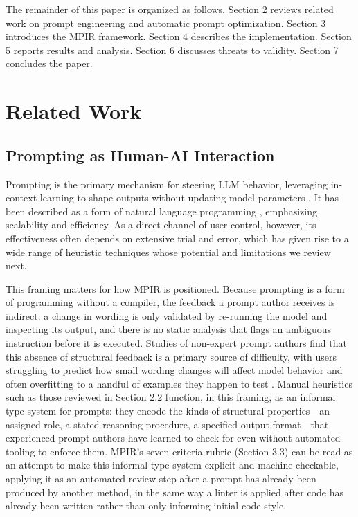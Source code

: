 \documentclass[a4paper,fleqn]{cas-sc}
\begin{document}
The remainder of this paper is organized as follows. Section 2 reviews related work on prompt engineering and automatic prompt optimization. Section 3 introduces the MPIR framework. Section 4 describes the implementation. Section 5 reports results and analysis. Section 6 discusses threats to validity. Section 7 concludes the paper.

\section{Related Work}

\subsection{Prompting as Human-AI Interaction}

Prompting is the primary mechanism for steering LLM behavior, leveraging in-context learning to shape outputs without updating model parameters \citep{liu2023}. It has been described as a form of natural language programming \citep{reynolds2021}, emphasizing scalability and efficiency. As a direct channel of user control, however, its effectiveness often depends on extensive trial and error, which has given rise to a wide range of heuristic techniques whose potential and limitations we review next.

This framing matters for how MPIR is positioned. Because prompting is a form of programming without a compiler, the feedback a prompt author receives is indirect: a change in wording is only validated by re-running the model and inspecting its output, and there is no static analysis that flags an ambiguous instruction before it is executed. Studies of non-expert prompt authors find that this absence of structural feedback is a primary source of difficulty, with users struggling to predict how small wording changes will affect model behavior and often overfitting to a handful of examples they happen to test \citep{zamfirescupereira2023}. Manual heuristics such as those reviewed in Section 2.2 function, in this framing, as an informal type system for prompts: they encode the kinds of structural properties---an assigned role, a stated reasoning procedure, a specified output format---that experienced prompt authors have learned to check for even without automated tooling to enforce them. MPIR's seven-criteria rubric (Section 3.3) can be read as an attempt to make this informal type system explicit and machine-checkable, applying it as an automated review step after a prompt has already been produced by another method, in the same way a linter is applied after code has already been written rather than only informing initial code style.
\end{document}
